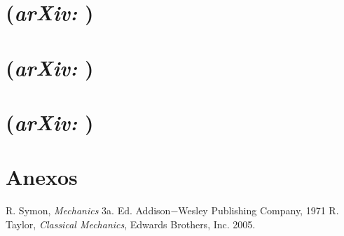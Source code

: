 \section{ (\textit{arXiv: })}
\justify
\lipsum[1]

\section{ (\textit{arXiv: })}
\justify
\lipsum[1]

\section{ (\textit{arXiv: })}
\justify
\lipsum[1]


\section{Anexos}
\label{sec:anexos}





\nocite{*}
%
%

\begin{thebibliography}{00}
 R. Symon, \textit{Mechanics} 3a. Ed. Addison$-$Wesley Publishing Company, 1971
 R. Taylor, \textit{Classical Mechanics}, Edwards Brothers, Inc. 2005.
\end{thebibliography}






